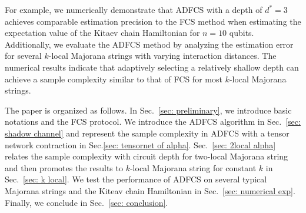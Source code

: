 \documentclass[showpacs,twocolumn,aps,prx,long bibliography,superscriptaddress,notitlepage]{revtex4-1}
\begin{document}
For example, we numerically demonstrate that ADFCS with a depth of $d^\ast = 3$ achieves comparable estimation precision to the FCS method when estimating the expectation value of the Kitaev chain Hamiltonian for $n=10$ qubits. 
Additionally, we evaluate the ADFCS method by analyzing the estimation error for several $k$-local  Majorana strings with varying interaction distances. The numerical results indicate that adaptively selecting a relatively shallow depth can achieve a sample complexity similar to that of FCS for most $k$-local Majorana strings.

The paper is organized as follows. In Sec.~\ref{sec: preliminary}, we introduce basic notations and the FCS protocol. We introduce the ADFCS algorithm in Sec.~\ref{sec: shadow channel} and represent the sample complexity in ADFCS with a tensor network contraction in Sec.\ref{sec: tensornet of alpha}. Sec.~\ref{sec: 2local alpha} relates the sample complexity with circuit depth for two-local Majorana string and then promotes the results to $k$-local Majorana string for constant $k$ in Sec.~\ref{sec: k local}. We test the performance of ADFCS on several typical Majorana strings and the Kiteav chain Hamiltonian in Sec.~\ref{sec: numerical exp}. Finally, we conclude in Sec.~\ref{sec: conclusion}.
\end{document}
